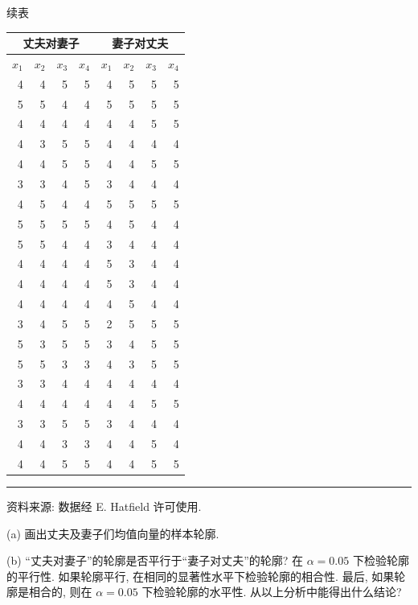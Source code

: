 
\begin{center}
\small 续表
\end{center}

\begin{mvtable}
\begin{tabular}{rrrr|rrrr}
\toprule
\multicolumn{4}{c}{丈夫对妻子} & \multicolumn{4}{c}{妻子对丈夫}\\\midrule
$x_1$ & $x_2$ & $x_3$ & $x_4$ & $x_1$ & $x_2$ & $x_3$ & $x_4$\\\midrule
4 & 4 & 5 & 5 & 4 & 5 & 5 & 5\\
5 & 5 & 4 & 4 & 5 & 5 & 5 & 5\\
4 & 4 & 4 & 4 & 4 & 4 & 5 & 5\\
4 & 3 & 5 & 5 & 4 & 4 & 4 & 4\\
4 & 4 & 5 & 5 & 4 & 4 & 5 & 5\\
3 & 3 & 4 & 5 & 3 & 4 & 4 & 4\\
4 & 5 & 4 & 4 & 5 & 5 & 5 & 5\\
5 & 5 & 5 & 5 & 4 & 5 & 4 & 4\\
5 & 5 & 4 & 4 & 3 & 4 & 4 & 4\\
4 & 4 & 4 & 4 & 5 & 3 & 4 & 4\\
4 & 4 & 4 & 4 & 5 & 3 & 4 & 4\\
4 & 4 & 4 & 4 & 4 & 5 & 4 & 4\\
3 & 4 & 5 & 5 & 2 & 5 & 5 & 5\\
5 & 3 & 5 & 5 & 3 & 4 & 5 & 5\\
5 & 5 & 3 & 3 & 4 & 3 & 5 & 5\\
3 & 3 & 4 & 4 & 4 & 4 & 4 & 4\\
4 & 4 & 4 & 4 & 4 & 4 & 5 & 5\\
3 & 3 & 5 & 5 & 3 & 4 & 4 & 4\\
4 & 4 & 3 & 3 & 4 & 4 & 5 & 4\\
4 & 4 & 5 & 5 & 4 & 4 & 5 & 5\\
\bottomrule
\end{tabular}
\end{mvtable}

\vspace{2pt}
\noindent\rule{\linewidth}{0.4pt}

\noindent\small 资料来源: 数据经 E. Hatfield 许可使用.

\vspace{1em}
\noindent (a) 画出丈夫及妻子们均值向量的样本轮廓.

\noindent (b) “丈夫对妻子”的轮廓是否平行于“妻子对丈夫”的轮廓? 在 $\alpha=0.05$ 下检验轮廓的平行性. 如果轮廓平行, 在相同的显著性水平下检验轮廓的相合性. 最后, 如果轮廓是相合的, 则在 $\alpha=0.05$ 下检验轮廓的水平性. 从以上分析中能得出什么结论?

